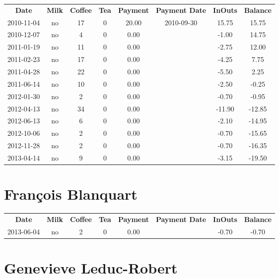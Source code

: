\begin{center}
\begin{tabular}{cccccccc}
\textbf{Date} & \textbf{Milk} & \textbf{Coffee} & \textbf{Tea} & \textbf{Payment} & \textbf{Payment Date} & \textbf{InOuts} & \textbf{Balance} \\
2010-11-04 & no & 17 & 0 & 20.00 & 2010-09-30 &  15.75 &  15.75\\ 
2010-12-07 & no &  4 & 0 &  0.00 &  &  -1.00 &  14.75\\ 
2011-01-19 & no & 11 & 0 &  0.00 &  &  -2.75 &  12.00\\ 
2011-02-23 & no & 17 & 0 &  0.00 &  &  -4.25 &   7.75\\ 
2011-04-28 & no & 22 & 0 &  0.00 &  &  -5.50 &   2.25\\ 
2011-06-14 & no & 10 & 0 &  0.00 &  &  -2.50 &  -0.25\\ 
2012-01-30 & no &  2 & 0 &  0.00 &  &  -0.70 &  -0.95\\ 
2012-04-13 & no & 34 & 0 &  0.00 &  & -11.90 & -12.85\\ 
2012-06-13 & no &  6 & 0 &  0.00 &  &  -2.10 & -14.95\\ 
2012-10-06 & no &  2 & 0 &  0.00 &  &  -0.70 & -15.65\\ 
2012-11-28 & no &  2 & 0 &  0.00 &  &  -0.70 & -16.35\\ 
2013-04-14 & no &  9 & 0 &  0.00 &  &  -3.15 & -19.50
\end{tabular}
\end{center}

\section{Fran\c{c}ois Blanquart}

\begin{center}
\begin{tabular}{cccccccc}
\textbf{Date} & \textbf{Milk} & \textbf{Coffee} & \textbf{Tea} & \textbf{Payment} & \textbf{Payment Date} & \textbf{InOuts} & \textbf{Balance} \\
2013-06-04 & no & 2 & 0 & 0.00 &  & -0.70 & -0.70
\end{tabular}
\end{center}

\section{Genevieve Leduc-Robert}

